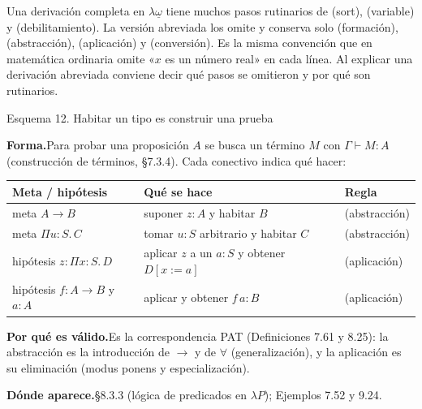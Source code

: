 \documentclass[11pt,a4paper]{article}
\newcommand{\forma}{\par\noindent\textbf{Forma.}\enspace}
\newcommand{\porque}{\par\smallskip\noindent\textbf{Por qué es válido.}\enspace}
\newcommand{\donde}{\par\smallskip\noindent\textbf{Dónde aparece.}\enspace}
\begin{document}
\begin{nota}
Una derivación completa en \(\lambda\underline{\omega}\) tiene muchos pasos
rutinarios de (sort), (variable) y (debilitamiento). La versión abreviada los
omite y conserva solo (formación), (abstracción), (aplicación) y
(conversión). Es la misma convención que en matemática ordinaria omite
«\(x\) es un número real» en cada línea. Al explicar una derivación abreviada
conviene decir qué pasos se omitieron y por qué son rutinarios.
\end{nota}

\begin{esquema}{Esquema 12. Habitar un tipo es construir una prueba}
\forma Para probar una proposición \(A\) se busca un término \(M\) con
\(\Gamma\vdash M:A\) (construcción de términos, §7.3.4). Cada conectivo indica
qué hacer:
\begin{center}
\begin{tabular}{@{}lll@{}}
\toprule
\textbf{Meta / hipótesis} & \textbf{Qué se hace} & \textbf{Regla}\\
\midrule
meta \(A\to B\) & suponer \(z:A\) y habitar \(B\) & (abstracción)\\
meta \(\Pi u{:}S.\,C\) & tomar \(u:S\) arbitrario y habitar \(C\) & (abstracción)\\
hipótesis \(z:\Pi x{:}S.\,D\) & aplicar \(z\) a un \(a:S\) y obtener \(D[x:=a]\) & (aplicación)\\
hipótesis \(f:A\to B\) y \(a:A\) & aplicar y obtener \(f\,a:B\) & (aplicación)\\
\bottomrule
\end{tabular}
\end{center}

\porque Es la correspondencia PAT (Definiciones 7.61 y 8.25): la abstracción
es la introducción de \(\to\) y de \(\forall\) (generalización), y la
aplicación es su eliminación (modus ponens y especialización).

\donde §8.3.3 (lógica de predicados en \(\lambda P\)); Ejemplos 7.52 y 9.24.
\end{esquema}
\end{document}
